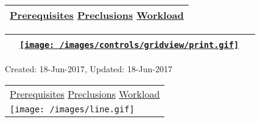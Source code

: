 \hypertarget{ctl00_ctl00_ContentPlaceHolder1_ContentPlaceHolder1_pnlReferences}{}
\begin{longtable}[]{@{}l@{}}
\toprule
\protect\hypertarget{ctl00_ctl00_ContentPlaceHolder1_ContentPlaceHolder1_lblSectionBottom}{}{\protect\hyperlink{Prerequisites}{Prerequisites}
\textbar{} \protect\hyperlink{Preclusions}{Preclusions} \textbar{}
\protect\hyperlink{Workload}{Workload}}\tabularnewline
\bottomrule
\end{longtable}

\hypertarget{ctl00_ctl00_ContentPlaceHolder1_ContentPlaceHolder1_UP}{}
\hypertarget{contentstart}{}
\hypertarget{ctl00_ctl00_ContentPlaceHolder1_ContentPlaceHolder1_pnlMain}{}
\begin{longtable}[]{@{}ll@{}}
\toprule
&
{\href{javascript:PrintThisPage();}{\texttt{[image: /images/controls/gridview/print.gif]}}~~}\tabularnewline
\bottomrule
\end{longtable}

\protect\hypertarget{ctl00_ctl00_ContentPlaceHolder1_ContentPlaceHolder1_LV_UpdateInfo_ctrl0_txtDate}{}{Created:
18-Jun-2017, Updated: 18-Jun-2017}

\begin{longtable}[]{@{}l@{}}
\toprule
\protect\hypertarget{ctl00_ctl00_ContentPlaceHolder1_ContentPlaceHolder1_lblSectionTop}{}{\protect\hyperlink{Prerequisites}{Prerequisites}
\textbar{} \protect\hyperlink{Preclusions}{Preclusions} \textbar{}
\protect\hyperlink{Workload}{Workload}}\tabularnewline
\texttt{[image: /images/line.gif]}\tabularnewline
\bottomrule
\end{longtable}

